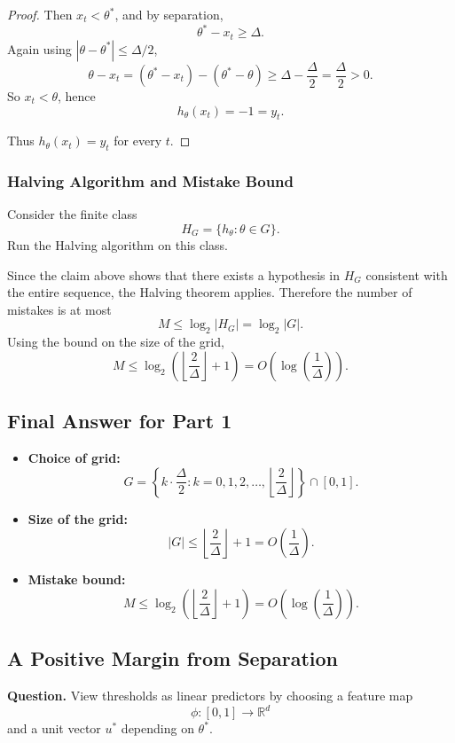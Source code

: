 \documentclass{article}
\begin{document}
\begin{solutionbox}
\begin{proof}
Then $x_t<\theta^*$, and by separation,
\[
\theta^*-x_t \ge \Delta.
\]
Again using $|\theta-\theta^*| \le \Delta/2$,
\[
\theta-x_t
=
(\theta^*-x_t)-(\theta^*-\theta)
\ge
\Delta-\frac{\Delta}{2}
=
\frac{\Delta}{2}
>0.
\]
So $x_t<\theta$, hence
\[
h_\theta(x_t)=-1=y_t.
\]

Thus $h_\theta(x_t)=y_t$ for every $t$.
\end{proof}

\subsubsection{Halving Algorithm and Mistake Bound}

Consider the finite class
\[
H_G=\{h_\theta:\theta\in G\}.
\]
Run the Halving algorithm on this class.

Since the claim above shows that there exists a hypothesis in $H_G$ consistent
with the entire sequence, the Halving theorem applies. Therefore the number of
mistakes is at most
\[
M \le \log_2 |H_G| = \log_2 |G|.
\]
Using the bound on the size of the grid,
\[
M
\le
\log_2\!\left(\left\lfloor \frac{2}{\Delta}\right\rfloor+1\right)
=
O\!\left(\log\left(\frac{1}{\Delta}\right)\right).
\]

\subsection*{Final Answer for Part 1}

\begin{itemize}[leftmargin=2.5em]
    \item \textbf{Choice of grid:}
    \[
    G=
    \left\{
    k\cdot \frac{\Delta}{2}
    :
    k=0,1,2,\dots,\left\lfloor \frac{2}{\Delta}\right\rfloor
    \right\}
    \cap [0,1].
    \]

    \item \textbf{Size of the grid:}
    \[
    |G|
    \le
    \left\lfloor \frac{2}{\Delta}\right\rfloor+1
    =
    O\!\left(\frac{1}{\Delta}\right).
    \]

    \item \textbf{Mistake bound:}
    \[
    M
    \le
    \log_2\!\left(\left\lfloor \frac{2}{\Delta}\right\rfloor+1\right)
    =
    O\!\left(\log\left(\frac{1}{\Delta}\right)\right).
    \]
\end{itemize}

\end{solutionbox}

\subsection{A Positive Margin from Separation}
\textbf{Question.}
\newline
View thresholds as linear predictors by choosing a feature map
\[
\phi:[0,1]\to \mathbb{R}^d
\]
and a unit vector $u^*$ depending on $\theta^*$.
\end{document}
